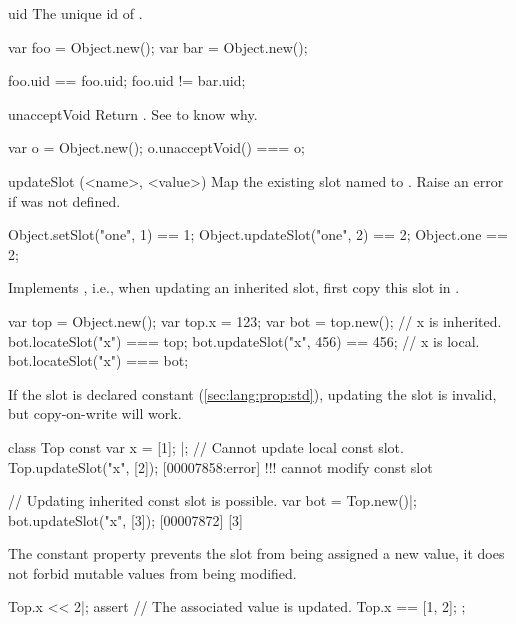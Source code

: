 \begin{urbiscriptapi}
\item[uid]
  The unique id of \this.
\begin{urbiassert}
var foo = Object.new();
var bar = Object.new();

foo.uid == foo.uid;
foo.uid != bar.uid;
\end{urbiassert}


\item[unacceptVoid]%
  Return \this.  See  to know why.
\begin{urbiassert}
var o = Object.new();
o.unacceptVoid() === o;
\end{urbiassert}



\item[updateSlot](<name>, <value>)%
  Map the existing slot named  to . Raise an
  error if  was not defined.
\begin{urbiassert}
Object.setSlot("one", 1)    == 1;
Object.updateSlot("one", 2) == 2;
Object.one                  == 2;
\end{urbiassert}

  Implements , i.e., when updating an inherited slot,
  first copy this slot in \this.

\begin{urbiassert}
var top = Object.new();
var top.x = 123;
var bot = top.new();
// x is inherited.
bot.locateSlot("x") === top;
bot.updateSlot("x", 456) == 456;
// x is local.
bot.locateSlot("x") === bot;
\end{urbiassert}

  If the slot is declared constant (\autoref{sec:lang:prop:std}), updating
  the slot is invalid, but copy-on-write will work.

\begin{urbiscript}
class Top
{
  const var x = [1];
}|;
// Cannot update local const slot.
Top.updateSlot("x", [2]);
[00007858:error] !!! cannot modify const slot

// Updating inherited const slot is possible.
var bot = Top.new()|;
bot.updateSlot("x", [3]);
[00007872] [3]
\end{urbiscript}

  The constant property prevents the slot from being assigned a new value,
  it does not forbid mutable values from being modified.

\begin{urbiscript}
Top.x << 2|;
assert
{
  // The associated value is updated.
  Top.x == [1, 2];
};
\end{urbiscript}
\end{urbiscriptapi}

